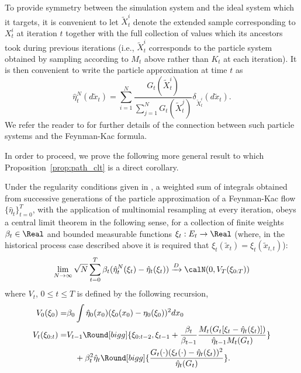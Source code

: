 To provide symmetry between the simulation system and the ideal system which
it targets, it is convenient to let $\tilde{X}_t^i$ denote the extended
sample corresponding to $X_t^i$ at iteration $t$ together with the full
collection of values which its ancestors took during previous iterations
(i.e., $\tilde{X}_t^i$ corresponds to the particle system obtained by
sampling according to $M_t$ above rather than $K_t$ at each iteration). It is
then convenient to write the particle approximation at time $t$ as
\begin{equation*}
  \hat\eta_t^N(d\tilde{x}_t) = \sum_{i=1}^N
  \frac{G_t(\tilde{X}_t^i)}{\sum_{j=1}^N G_t(\tilde{X}_t^j)}
  \delta_{\tilde{X}_t^i}(d\tilde{x}_t).
\end{equation*}
We refer the reader to
\cite{DelMoral:2004ux} for further details of the connection between such
particle systems and the Feynman-Kac formula.

In order to proceed, we prove the following more general result to which
Proposition~\ref{prop:path_clt} is a direct corollary.

\begin{proposition}\label{prop:gen_clt}
  Under the regularity conditions given in
  \cite[][sec.~9.4,]{DelMoral:2004ux}, a weighted sum of integrals obtained
  from successive generations of the particle approximation of a Feynman-Kac
  flow $\{\hat\eta_t\}_{t=0}^T$, with the application of multinomial
  resampling at every iteration, obeys a central limit theorem in the
  following sense, for a collection of finite weights $\beta_t\in\Real$ and
  bounded measurable functions $\xi_t:E_t \to\Real$ (where, in the historical
  process case described above it is required that $\xi_t(\tilde{x}_t) =
  \xi_t(\tilde{x}_{t,t})$):
  \begin{equation}
    \lim_{N\to\infty}\sqrt{N}
    \sum_{t=0}^T\beta_t(\hat\eta_t^N(\xi_t)-\hat\eta_t(\xi_t))
    \xrightarrow{D}\calN(0,V_T(\xi_{0:T}))
  \end{equation}
  where $V_t$, $0\le t \le T$ is defined by the following recursion,
  \begin{align}
    V_0(\xi_0) =& \beta_0 \int \hat\eta_0(x_0)(\xi_0(x_0) -
    \eta_0(\xi_0))^2 dx_0\notag\\
    V_t(\xi_{0:t}) =& V_{t-1}\Round[bigg]{\xi_{0:t-2}, \xi_{t-1}
      + \frac{\beta_t}{\beta_{t-1}}
      \frac{M_t(G_t[\xi_t-\hat\eta_t(\xi_t)])}{\hat\eta_{t-1}M_t(G_t)}}\notag\\
    &\quad+ \beta_t^2\hat\eta_t\Round[bigg]{
      \frac{G_t(\cdot) (\xi_t(\cdot)-\hat\eta_t(\xi_t))^2}{\hat\eta_t(G_t)}}.
  \end{align}
\end{proposition}

